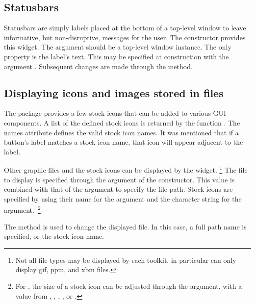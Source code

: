 \subsection{Statusbars}
\label{sec:gWidgets-statusbars}

Statusbars are simply labels placed at the bottom of a top-level window to leave
informative, but non-disruptive, messages for the user.  The
 constructor provides this widget.  The
 argument should be a top-level window instance. 
The only property is the label's text. This may be specified at
construction with the argument
. Subsequent changes are made through
the  method. 




\subsection{Displaying icons and images stored in files}
\label{sec:gWidgets-displ-icons-imag}

The  package provides a few stock icons that can be
added to various GUI components. A list of the defined stock icons is
returned by the function .  The names attribute
defines the valid stock icon names. It was mentioned that if a
button's label matches a stock icon name, that icon will appear
adjacent to the label.



Other graphic files and the stock icons can be displayed by the
 widget. \footnote{Not all file types may be
  displayed by each toolkit, in particular  can
  only display gif, ppm, and xbm files.} The file to display is
specified through the  argument of the
constructor. This value is combined with that of the
 argument to specify the file path.  Stock
icons are specified by using their name for the 
argument and the character string  for the
 argument.~\footnote{For , the size
  of a stock icon can be adjusted through the 
  argument, with a value from , ,
  , , or .}

The  method is used to change the
displayed file. In this case, a full path name is specified, or the
stock icon name.

